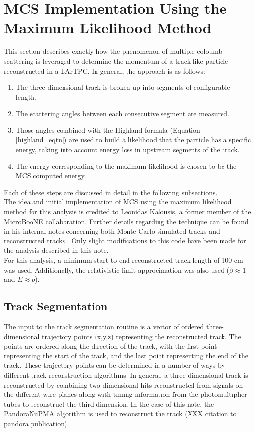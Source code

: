 \section{MCS Implementation Using the Maximum Likelihood Method}\label{MCS_technique_section}

This section describes exactly how the phenomenon of multiple coloumb scattering is leveraged to determine the momentum of a track-like particle reconstructed in a LArTPC. In general, the approach is as follows:
\begin{enumerate}
\item The three-dimensional track is broken up into segments of configurable length.
\item The scattering angles between each consecutive segment are measured.
\item Those angles combined with the Highland formula (Equation \ref{highland_eqtn}) are used to build a likelihood that the particle has a specific energy, taking into account energy loss in upstream segments of the track.
\item The energy corresponding to the maximum likelihood is chosen to be the MCS computed energy.
\end{enumerate}
Each of these steps are discussed in detail in the following subsections.\\

The idea and initial implementation of MCS using the maximum likelihood method for this analysis is credited to Leonidas Kalousis, a former member of the MicroBooNE collaboration. Further details regarding the technique can be found in his internal notes concerning both Monte Carlo simulated tracks \cite{leonidas1} and reconstructed tracks \cite{leonidas2}. Only slight modifications to this code have been made for the analysis described in this note.\\

For this analysis, a minimum start-to-end reconstructed track length of 100 cm was used. Additionally, the relativistic limit approcimation was also used ($\beta \approx 1$ and $E \approx p$).

\subsection{Track Segmentation}\label{track_segmentation_section}
The input to the track segmentation routine is a vector of ordered three-dimensional trajectory points (x,y,z) representing the reconstructed track. The points are ordered along the direction of the track, with the first point representing the start of the track, and the last point representing the end of the track. These trajectory points can be determined in a number of ways by different track reconstruction algorithms. In general, a three-dimensional track is reconstructed by combining two-dimensional hits reconstructed from signals on the different wire planes along with timing information from the photomultiplier tubes to reconstruct the third dimension. In the case of this note, the PandoraNuPMA algorithm is used to reconstruct the track (XXX citation to pandora publication).\\

